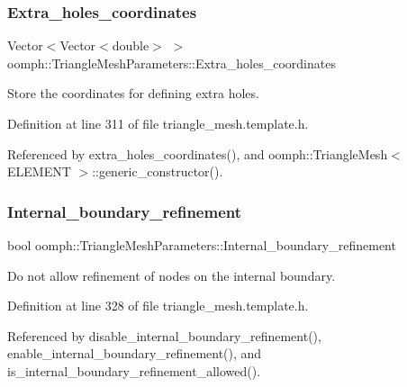 \subsubsection{\texorpdfstring{Extra\+\_\+holes\+\_\+coordinates}{Extra\_holes\_coordinates}}
{\footnotesize\ttfamily Vector$<$Vector$<$double$>$ $>$ oomph\+::\+Triangle\+Mesh\+Parameters\+::\+Extra\+\_\+holes\+\_\+coordinates\hspace{0.3cm}{\ttfamily [protected]}}



Store the coordinates for defining extra holes. 



Definition at line 311 of file triangle\+\_\+mesh.\+template.\+h.



Referenced by extra\+\_\+holes\+\_\+coordinates(), and oomph\+::\+Triangle\+Mesh$<$ E\+L\+E\+M\+E\+N\+T $>$\+::generic\+\_\+constructor().

\mbox{\label{classoomph_1_1TriangleMeshParameters_a5d4823276b94bc4b3d4dbbd8d351596c}} 
\subsubsection{\texorpdfstring{Internal\+\_\+boundary\+\_\+refinement}{Internal\_boundary\_refinement}}
{\footnotesize\ttfamily bool oomph\+::\+Triangle\+Mesh\+Parameters\+::\+Internal\+\_\+boundary\+\_\+refinement\hspace{0.3cm}{\ttfamily [protected]}}



Do not allow refinement of nodes on the internal boundary. 



Definition at line 328 of file triangle\+\_\+mesh.\+template.\+h.



Referenced by disable\+\_\+internal\+\_\+boundary\+\_\+refinement(), enable\+\_\+internal\+\_\+boundary\+\_\+refinement(), and is\+\_\+internal\+\_\+boundary\+\_\+refinement\+\_\+allowed().

\mbox{\label{classoomph_1_1TriangleMeshParameters_a99475f8749f590b46554e6e6d9e8af78}} 
